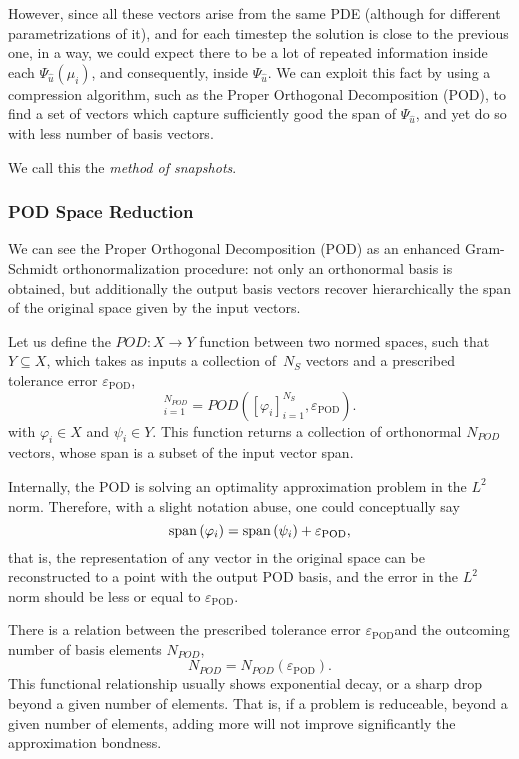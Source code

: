 \documentclass[../../thesis.tex]{subfiles}
\newcommand{\epspod}{\ensuremath{\varepsilon_\text{POD}}}
\begin{document}
However, since all these vectors arise from the same PDE (although for different parametrizations of it), and for each timestep the solution is close to the previous one, in a way, we could expect there to be a lot of repeated information inside each $\Psi_{\hat{u}}(\mu_i)$, and consequently, inside $\Psi_{\hat{u}}$.
We can exploit this fact by using a compression algorithm, such as the Proper Orthogonal Decomposition (POD), to find a set of vectors which capture sufficiently good the span of $\Psi_{\hat{u}}$, and yet do so with less number of basis vectors. 

We call this the \emph{method of snapshots}. 

\subsubsection{POD Space Reduction}
\label{sec:1d_rom_burgers_basis_construction_pod}
We can see the Proper Orthogonal Decomposition (POD) as 
an enhanced Gram-Schmidt orthonormalization procedure: not only an orthonormal basis is obtained, 
but additionally the output basis vectors recover hierarchically the span of the original space 
given by the input vectors.

Let us define the $POD: X \rightarrow Y$ function between two normed spaces, 
such that $Y \subseteq  X$, 
which takes as inputs a collection of~$N_S$ vectors and a prescribed tolerance error $\epspod$,
\begin{equation}
    [\psi_i]_{i=1}^{N_{POD}} = POD\left([\varphi_i]_{i=1}^{N_S}, \epspod\right).
\end{equation}
with $\varphi_i \in X$ and $\psi_i \in Y$.
This function returns a collection of orthonormal $N_{POD}$ vectors, whose span is a subset of the input vector span.

Internally, the POD is solving an optimality approximation problem in the $L^2$ norm. 
Therefore, with a slight notation abuse, one could conceptually say
\begin{equation}
    \spn{\varphi_i} = \spn{\psi_i} + \epspod,
\end{equation}
that is, the representation of any vector in the original space can be reconstructed to a point with the output POD basis, 
and the error in the $L^2$ norm should be less or equal to \epspod.

There is a relation between the prescribed tolerance error \epspod and the outcoming number of basis elements $N_{POD}$, 
\begin{equation}
    N_{POD} = N_{POD}(\epspod).
\end{equation}
This functional relationship usually shows exponential decay, or a sharp drop beyond a given number of elements.
That is, if a problem is reduceable, beyond a given number of elements, adding more will not improve significantly the approximation bondness. 
\end{document}
